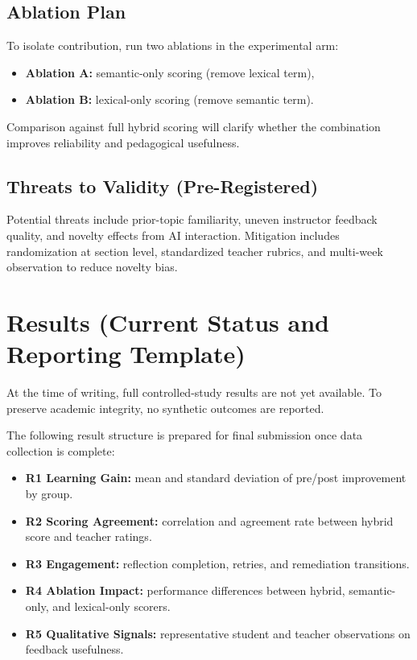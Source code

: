 \documentclass[conference]{IEEEtran}
\begin{document}
\subsection{Ablation Plan}
To isolate contribution, run two ablations in the experimental arm:
\begin{itemize}
\item \textbf{Ablation A:} semantic-only scoring (remove lexical term),
\item \textbf{Ablation B:} lexical-only scoring (remove semantic term).
\end{itemize}

Comparison against full hybrid scoring will clarify whether the combination improves reliability and pedagogical usefulness.

\subsection{Threats to Validity (Pre-Registered)}
Potential threats include prior-topic familiarity, uneven instructor feedback quality, and novelty effects from AI interaction. Mitigation includes randomization at section level, standardized teacher rubrics, and multi-week observation to reduce novelty bias.

\section{Results (Current Status and Reporting Template)}
At the time of writing, full controlled-study results are not yet available. To preserve academic integrity, no synthetic outcomes are reported.

The following result structure is prepared for final submission once data collection is complete:
\begin{itemize}
\item \textbf{R1 Learning Gain:} mean and standard deviation of pre/post improvement by group.
\item \textbf{R2 Scoring Agreement:} correlation and agreement rate between hybrid score and teacher ratings.
\item \textbf{R3 Engagement:} reflection completion, retries, and remediation transitions.
\item \textbf{R4 Ablation Impact:} performance differences between hybrid, semantic-only, and lexical-only scorers.
\item \textbf{R5 Qualitative Signals:} representative student and teacher observations on feedback usefulness.
\end{itemize}
\end{document}
